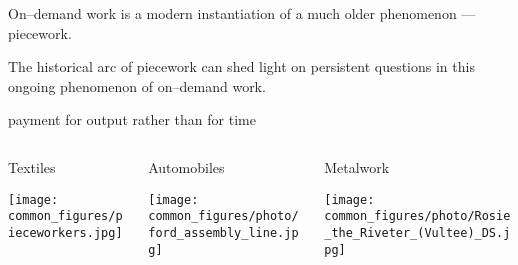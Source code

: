 \documentclass[../presentation]{subfiles}
\begin{document}
\begin{frame}[standout,label=takeaway]
  On--demand work is a modern instantiation of a much older phenomenon
  --- {piecework}.

  {\normalsize The historical arc of piecework
  can shed light on persistent questions
  in this ongoing phenomenon of on--demand work.}
\end{frame}


\begin{frame}[t]{payment for output rather than for time}
  \begin{columns}[T]
    \begin{column}{0.33\textwidth}
      \centering
      Textiles

      \vspace{0.5em}

      \texttt{[image: common\_figures/pieceworkers.jpg]}
    \end{column}
    \begin{column}{0.33\textwidth}
      \centering
      Automobiles

      \vspace{0.5em}

      \texttt{[image: common\_figures/photo/ford\_assembly\_line.jpg]}
    \end{column}
    \begin{column}{0.33\textwidth}
      \centering
      Metalwork

      \vspace{0.5em}

      \texttt{[image: common\_figures/photo/Rosie\_the\_Riveter\_(Vultee)\_DS.jpg]}
    \end{column}
  \end{columns}
  \vspace*{7mm}
  
\end{frame}
\end{document}

